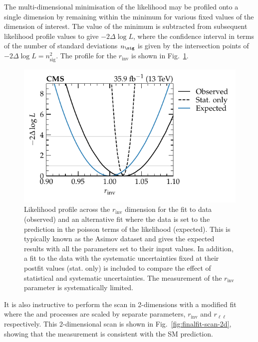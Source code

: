 The multi-dimensional minimisation of the likelihood may be profiled onto a
single dimension by remaining within the minimum for various fixed values of
the dimension of interest. The value of the minimum is subtracted from
subsequent likelihood profile values to give $-2\Delta\log L$, where the
confidence interval in terms of the number of standard deviations $n_{\sig}$
is given by the intersection points of $-2\Delta\log L=n_{\mathrm{sig}}^2$.
The profile for the $r_{\mathrm{inv}}$ is shown in
Fig.~\ref{fig:finalfit-scan-1d}.
%
\begin{figure}
    \centering
    \includegraphics{chapters/043_results/images/finalfit-scan-1d.pdf}
    \caption[Likelihood profile in the $r_{\mathrm{inv}}$ dimension.]{
     Likelihood profile across the $r_{\mathrm{inv}}$ dimension for the fit to data (observed) and an alternative fit where the data is set to the prediction in the poisson terms of the likelihood (expected). This is typically known as the Asimov dataset and gives the expected results with all the parameters set to their input values. In addition, a fit to the data with the systematic uncertainties fixed at their postfit values (stat. only) is included to compare the effect of statistical and systematic uncertainties. The measurement of the $r_{\mathrm{inv}}$ parameter is systematically limited.
    }
    \label{fig:finalfit-scan-1d}
\end{figure}
%
It is also instructive to perform the scan in 2-dimensions with a modified fit
where the \IZvvj and \IZllj processes are scaled by separate parameters,
$r_{\mathrm{inv}}$ and $r_{\ell\ell}$ respectively. This 2-dimensional scan is
shown in Fig.~\ref{fig:finalfit-scan-2d}, showing that the measurement is consistent with the SM prediction.
%
